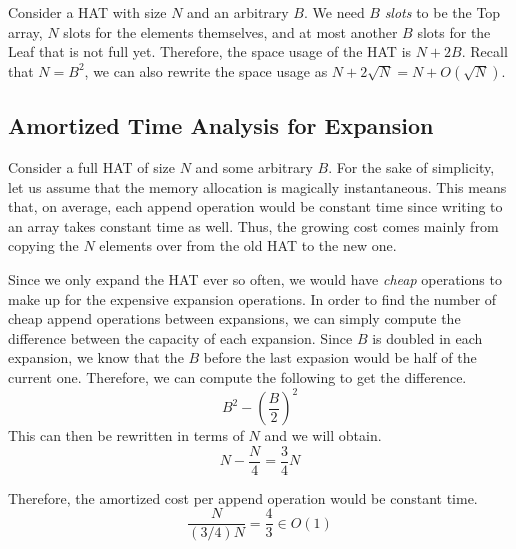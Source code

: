 Consider a HAT with size $N$ and an arbitrary $B$. We need $B$ \textit{slots} to be the Top array,
$N$ slots for the elements themselves, and at most another $B$ slots for the Leaf that is not full
yet. Therefore, the space usage of the HAT is $N + 2B$. Recall that $N = B^2$, we can also rewrite
the space usage as $N + 2\sqrt{N} = N + O(\sqrt{N})$.

\subsection*{Amortized Time Analysis for Expansion}

Consider a full HAT of size $N$ and some arbitrary $B$. For the sake of simplicity, let us assume
that the memory allocation is magically instantaneous. This means that, on average, each append
operation would be constant time since writing to an array takes constant time as well.
Thus, the growing cost comes mainly from copying the $N$ elements over from the old HAT
to the new one.

Since we only expand the HAT ever so often, we would have \textit{cheap} operations to make up for 
the expensive expansion operations. In order to find the number of cheap append operations between
expansions, we can simply compute the difference between the capacity of each expansion. Since $B$
is doubled in each expansion, we know that the $B$ before the last expasion would be half of the
current one. Therefore, we can compute the following to get the difference.
\[ B^2 - \left(\frac{B}{2}\right)^2 \]
This can then be rewritten in terms of $N$ and we will obtain.
\[ N - \frac{N}{4} = \frac{3}{4}N \]

Therefore, the amortized cost per append operation would be constant time.
\[ \frac{N}{(3/4)N} = \frac{4}{3} \in O(1) \]

\endgroup